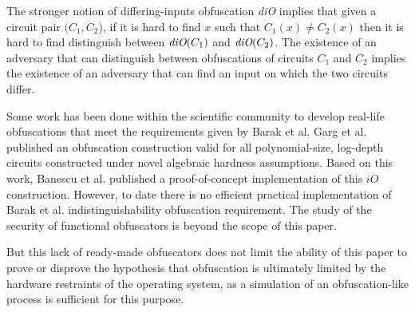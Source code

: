 \par
The stronger notion of differing-inputs obfuscation \emph{diO} implies that given
a circuit pair $(C_1, C_2$), if it is hard to find $x$ such that $C_1(x) \neq C_2(x)$
then it is hard to find distinguish between $\emph{diO}(C_1)$ and $\emph{diO}(C_2)$\cite{dio}.
The existence of an adversary that can distinguish between
obfuscations of circuits $C_1$ and $C_2$ implies the existence of an adversary
that can find an input on which the two circuits differ\cite{barak}.
\par
Some work has been done within the scientific community to develop real-life
obfuscations that meet the requirements given by Barak et al. Garg et al.\cite{garg}
published an obfuscation construction valid for all polynomial-size, log-depth
circuits constructed under novel algebraic hardness assumptions. Based on this
work, Banescu et al.\cite{tum} published a proof-of-concept implementation of
this $iO$ construction.
However, to date there is no efficient practical implementation of Barak et al.\cite{barak}
indistinguishability obfuscation requirement. The study of the security of
functional obfuscators is beyond the scope of this paper.
\par
But this lack of ready-made obfuscators does not limit the ability of this paper
to prove or disprove the hypothesis that obfuscation is ultimately limited by the
hardware restraints of the operating system, as a simulation of an obfuscation-like
process is sufficient for this purpose.
